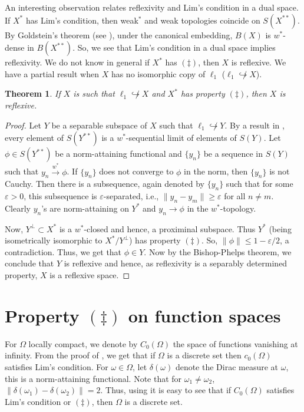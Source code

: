 \documentclass[11pt]{amsart}
\newcommand{\e}{\varepsilon}
\newtheorem{thm}{Theorem}
\begin{document}
An interesting observation relates reflexivity and Lim's condition in a dual space. If $X^\ast$ has Lim's condition, then weak$^\ast$ and weak topologies coincide on $S(X^{\ast\ast})$. By Goldstein's theorem (see \cite{Ho}), under the canonical embedding, $B(X)$ is $w^*$-dense in $B(X^{\ast\ast})$. So, we see that Lim's condition in a dual space implies reflexivity. We do not know in general if $X^\ast$ has  $(\ddag)$, then $X$ is reflexive. We have a partial result when $X$ has no isomorphic copy of $\ell_1$ ($\ell_1 \not\hookrightarrow X$).
  \begin{thm}
  	If $X$ is such that $\ell_1 \not\hookrightarrow X$ and $X^*$ has property $(\ddag)$, then $X$ is reflexive.
  \end{thm}
  \begin{proof}
  	Let $Y$ be a separable subspace of $X$ such that $\ell_1 \not\hookrightarrow Y$.  By a result in \cite[Pg. 215]{Di}, every element of $S(Y^{**})$ is a $w^*$-sequential limit of elements of $S(Y)$. Let $\phi \in S(Y^{**})$ be a norm-attaining functional and $\{y_n\}$ be a sequence in $S(Y)$ such that $y_n \xrightarrow{w^\ast} \phi$. If $\{y_n\}$ does not converge to $\phi$ in the norm, then  $\{y_n\}$ is not Cauchy. Then there is a subsequence, again denoted by $\{y_n\}$ such that for some $\e >0$, this subsequence is $\e$-separated, i.e.,  $\|y_n-y_m\| \geq \e$ for all $n \neq m$. Clearly $y_n$'s are norm-attaining on $Y^\ast$ and $y_n \rightarrow \phi$ in the $w^*$-topology.
  	
  	Now, $Y^\perp \subset X^*$ is a $w^*$-closed and hence, a proximinal subspace. Thus $Y^*$ (being isometrically isomorphic to $X^*/Y^\perp$) has property $(\ddag)$.
  	So, $\|\phi\| \leq 1-\e/2$, a contradiction. Thus, we get that $\phi \in Y$. Now by the Bishop-Phelps theorem, we conclude that $Y$ is reflexive and hence, as reflexivity is a separably determined property, $X$ is a reflexive space.
  	
  	
  \end{proof}

\section{Property $(\ddag)$ on function spaces}
For $\Omega$ locally compact, we denote by $C_0(\Omega)$ the space of functions vanishing at infinity. From the proof of \cite[Theorem 4]{LM}, we get that if $\Omega$ is a discrete set then $c_0(\Omega)$ satisfies Lim's condition. For $ \omega \in \Omega$, let $\delta(\omega)$ denote the Dirac measure at $\omega$, this is a norm-attaining functional. Note that for $ \omega_1\neq \omega_2$, $\|\delta(\omega_1)-\delta(\omega_2)\|=2$. Thus, using \cite[Theorem 4]{LM} it is easy to see that if $C_0(\Omega)$ satisfies Lim's condition or $(\ddag)$, then $\Omega$ is a discrete set.
\end{document}
